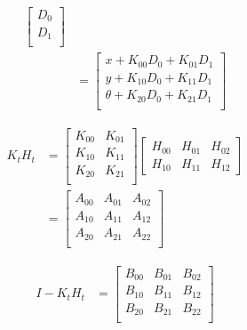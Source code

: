 \documentclass[oneside, 12pt, a4paper]{book}
\begin{document}
\begin{equation}
\begin{split}
        \begin{bmatrix}
            D_{0}\\
            D_{1}\\ 
        \end{bmatrix}\\
        &=
        \begin{bmatrix}
            x + K_{00}D_0 + K_{01}D_1\\
            y + K_{10}D_0 + K_{11}D_1\\ 
            \theta + K_{20}D_0 + K_{21}D_1\\
        \end{bmatrix} 
    \end{split}
\end{equation}

\begin{equation}
    \begin{split}
        K_tH_t &=
        \begin{bmatrix}
            K_{00} & K_{01}\\
            K_{10} & K_{11}\\ 
            K_{20} & K_{21}\\
        \end{bmatrix}
        \begin{bmatrix}
            H_{00} & H_{01} & H_{02} \\
            H_{10} & H_{11} & H_{12}
        \end{bmatrix}\\
        &=
        \begin{bmatrix}
            A_{00} & A_{01} & A_{02}\\
            A_{10} & A_{11} & A_{12}\\ 
            A_{20} & A_{21} & A_{22}\\
        \end{bmatrix}
    \end{split}
\end{equation}

\begin{equation}
    \begin{split}
        I - K_tH_t &=
        \begin{bmatrix}
            B_{00} & B_{01} & B_{02}\\
            B_{10} & B_{11} & B_{12}\\ 
            B_{20} & B_{21} & B_{22}\\
        \end{bmatrix}
    \end{split}
\end{equation}
\end{document}
